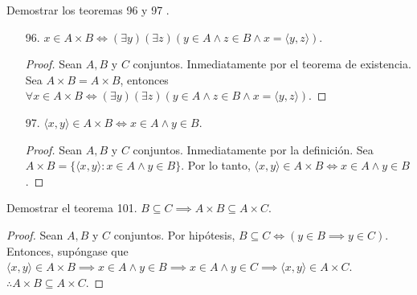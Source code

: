 	\begin{problema}
	 Demostrar los teoremas 96 y 97 .\begin{enumerate}
	 	\item[96.] $x\in A\times B\iff (\exists y)(\exists z)(y\in A\wedge z\in B\wedge x=\langle y, z\rangle)$.
	 	\begin{proof}
	 		Sean $A,B$ y $C$ conjuntos. Inmediatamente por el teorema de existencia. Sea $A\times B = A\times B$, entonces 
	 		$\forall x\in A\times B\iff (\exists y)(\exists z)(y\in A\wedge z\in B\wedge x=\langle y, z\rangle)$.
	 	\end{proof}
	 	
	 	\item[97.] $\langle x,y\rangle \in A\times B \iff x\in A \wedge y\in B$.
	 	\begin{proof}
	 		Sean $A,B$ y $C$ conjuntos. Inmediatamente por la definición. Sea $A\times B=\{\langle x,y\rangle: x\in A\wedge y\in B\}$. Por lo tanto, $\langle x,y\rangle \in A\times B \iff x\in A \wedge y\in B$.
	 	\end{proof}
	 	
	 \end{enumerate}
\end{problema}


\begin{problema}
	Demostrar el teorema 101. $B\subseteq C\implies A\times B\subseteq A\times C$.
\end{problema}
\begin{proof}
	Sean $A,B$ y $C$ conjuntos. Por hipótesis, $B\subseteq C\iff (y\in B\implies y\in C)$. Entonces, supóngase que $\langle x,y\rangle \in A\times B\implies x\in A\wedge y\in B\implies x\in A\wedge y\in C\implies\langle x,y\rangle \in A\times C $. $\therefore A\times B\subseteq A\times C$. 
\end{proof}


